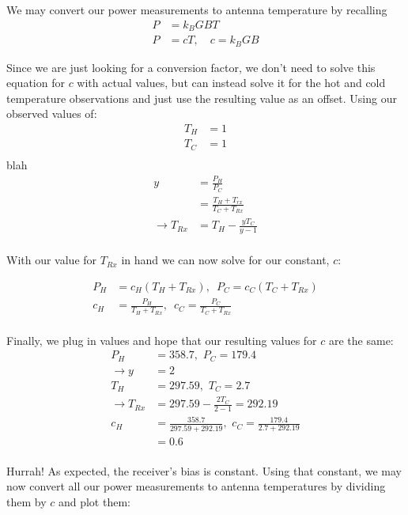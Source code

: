\documentclass[12pt]{article}
\newenvironment{writeup}[2][Write-Up]{\begin{trivlist}
\item[\hskip \labelsep {\bfseries #1}\hskip \labelsep {\bfseries #2.}]}{\end{trivlist}}
\begin{document}
\begin{writeup}{2}
  We may convert our power measurements to antenna temperature by recalling
  \begin{align*}
    P &= k_B G B T \\
    P &= cT, \,\,\,\,\,\, c = k_B G B
  \end{align*}

  Since we are just looking for a conversion factor, we don't need to solve this equation for $c$ with actual values, but can instead solve it for the hot and cold temperature observations and just use the resulting value as an offset. Using our observed values of:
  \begin{align*}
    T_H &= 1 \\
    T_C &= 1 \\
  \end{align*}
  blah
  \begin{align*}
    y &= \frac{P_H}{P_C} \\
      &= \frac{T_H + T_{rx}}{T_C + T_{Rx}} \\
    \rightarrow T_{Rx} &= T_H - \frac{y T_C}{y - 1} \\
  \end{align*}

  With our value for $T_{Rx}$ in hand we can now solve for our constant, $c$:

  \begin{align*}
    P_H &= c_H \left(T_H + T_{Rx} \right), \,\,\,  P_C = c_C \left(T_C + T_{Rx} \right) \\
    c_H &= \frac{P_H}{T_H + T_{Rx}}, \,\,\, c_C = \frac{P_C}{T_C + T_{Rx}} \\
  \end{align*}

  Finally, we plug in values and hope that our resulting values for $c$ are the same:
  \begin{align*}
    P_H &= 358.7, \,\, P_C = 179.4 \\
    \rightarrow y &= 2 \\
    T_H &= 297.59, \,\, T_C = 2.7 \\
    \rightarrow T_{Rx} &= 297.59 - \frac{2 T_C}{2-1} = 292.19 \\
    c_H &= \frac{358.7}{297.59 + 292.19}, \,\, c_C = \frac{179.4}{2.7 + 292.19} \\
        &= 0.6 \\
  \end{align*}

  Hurrah! As expected, the receiver's bias is constant. Using that constant, we may now convert all our power measurements to antenna temperatures by dividing them by $c$ and plot them:


\end{writeup}
\end{document}
